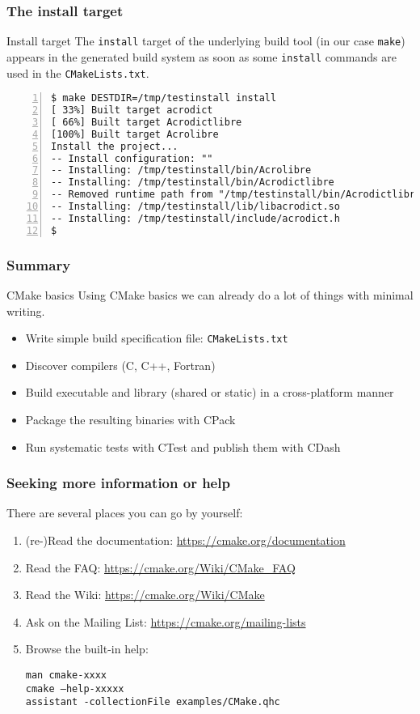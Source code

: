 \documentclass[compress,slidestop,table,usepdftitle=false
              ]
               {beamer}
\newcommand{\fname}[1]{\texttt{#1}}
\begin{document}

\begin{frame}[fragile]
\frametitle{The install target}
\begin{block}{Install target}
The \fname{install} target of the underlying build tool (in our case \fname{make})
appears in the generated build system as soon as some \lstinline!install!
commands are used in the \fname{CMakeLists.txt}.
\end{block}
\begin{Verbatim}[commandchars=\\\{\},fontsize=\scriptsize,numbers=left]
$ make DESTDIR=/tmp/testinstall install
[ 33%] Built target acrodict
[ 66%] Built target Acrodictlibre
[100%] Built target Acrolibre
Install the project...
-- Install configuration: ""
-- Installing: /tmp/testinstall/bin/Acrolibre
-- Installing: /tmp/testinstall/bin/Acrodictlibre
-- Removed runtime path from "/tmp/testinstall/bin/Acrodictlibre"
-- Installing: /tmp/testinstall/lib/libacrodict.so
-- Installing: /tmp/testinstall/include/acrodict.h
$
\end{Verbatim}
\end{frame}


\begin{frame}[fragile]
\frametitle{Summary}
\begin{block}{CMake basics}
Using CMake basics we can already do a lot of things with minimal writing.
\end{block}
\begin{itemize}
\item Write simple build specification file: \fname{CMakeLists.txt}
\item Discover compilers (C, C++, Fortran)
\item Build executable and library (shared or static) in a cross-platform manner
\item Package the resulting binaries with CPack
\item Run systematic tests with CTest and publish them with CDash
\end{itemize}
\end{frame}

\begin{frame}[fragile]
\frametitle{Seeking more information or help}
There are several places you can go by yourself:
\begin{enumerate}
\item {\tiny(re-)}Read the documentation: \url{https://cmake.org/documentation}
\item Read the FAQ: \url{https://cmake.org/Wiki/CMake_FAQ}
\item Read the Wiki: \url{https://cmake.org/Wiki/CMake}
\item Ask on the Mailing List: \url{https://cmake.org/mailing-lists}
\item Browse the built-in help:

     \fname{man cmake-xxxx}\\
     \fname{cmake --help-xxxxx}\\
     \fname{assistant -collectionFile examples/CMake.qhc}
\end{enumerate}
\end{frame}
\end{document}
